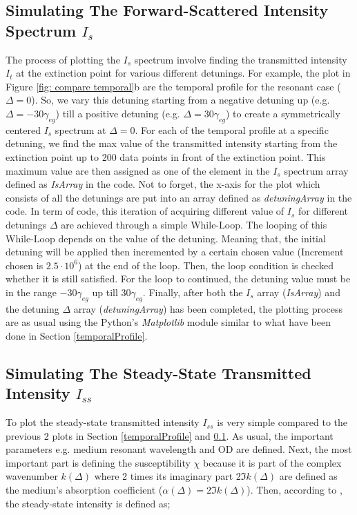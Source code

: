 \subsection{Simulating The Forward-Scattered Intensity Spectrum $I_{s}$}\label{forwardScattered}
The process of plotting the $I_{s}$ spectrum involve finding the transmitted intensity $I_{t}$ at the extinction point for various different detunings. For example, the plot in Figure \ref{fig: compare temporal}b are the temporal profile for the resonant case ($\Delta = 0$). So, we vary this detuning starting from a negative detuning up (e.g. $\Delta = -30\gamma_{eg}$) till a positive detuning (e.g. $\Delta = 30\gamma_{eg}$) to create a symmetrically centered $I_{s}$ spectrum at $\Delta = 0$. For each of the temporal profile at a specific detuning, we find the max value of the transmitted intensity starting from the extinction point up to 200 data points in front of the extinction point. This maximum value are then assigned as one of the element in the $I_{s}$ spectrum array defined as \textit{IsArray} in the code. Not to forget, the x-axis for the plot which consists of all the detunings are put into an array defined as \textit{detuningArray} in the code. In term of code, this iteration of acquiring different value of $I_{s}$ for different detunings $\Delta$ are achieved through a simple While-Loop. The looping of this While-Loop depends on the value of the detuning. Meaning that, the initial detuning will be applied then incremented by a certain chosen value (Increment chosen is $2.5 \cdot 10^{6}$) at the end of the loop. Then, the loop condition is checked whether it is still satisfied. For the loop to continued, the detuning value must be in the range $-30\gamma_{eg}$ up till $30\gamma_{eg}$. Finally, after both the $I_{s}$ array (\textit{IsArray}) and the detuning $\Delta$ array (\textit{detuningArray}) has been completed, the plotting process are as usual using the Python's \textit{Matplotlib} module similar to what have been done in Section \ref{temporalProfile}.

\subsection{Simulating The Steady-State Transmitted Intensity $I_{ss}$}\label{steady}
To plot the steady-state transmitted intensity $I_{ss}$ is very simple compared to the previous 2 plots in Section \ref{temporalProfile} and \ref{forwardScattered}. As usual, the important parameters e.g. medium resonant wavelength and OD are defined. Next, the most important part is defining the susceptibility $\chi$ because it is part of the complex wavenumber $k(\Delta)$ where 2 times its imaginary part $2\Im{k(\Delta)}$ are defined as the medium's absorption coefficient ($\alpha(\Delta) = 2\Im{k(\Delta)}$). Then, according to \cite{boyd2020nonlinear}, the steady-state intensity is defined as;

